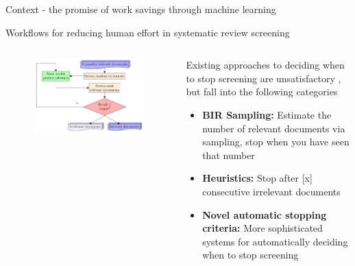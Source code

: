 \documentclass[9pt, aspectratio=169]{beamer}
\begin{document}
\begin{frame}{Context - the promise of work savings through machine learning}
\end{frame}

\begin{frame}{Workflows for reducing human effort in systematic review screening}

\begin{columns}
	\begin{column}{0.6\linewidth}
		\begin{figure}
			\includegraphics[width=\linewidth]{../images/flow_noeq_basic.pdf}
		\end{figure}
	\end{column}
	\begin{column}{0.4\linewidth}
		Existing approaches to deciding when to stop screening are unsatisfactory \cite{bannach-brown2019, Marshall2019}, but fall into the following categories
		
		\medskip
		
		\begin{itemize}
			\item \textbf{BIR Sampling:} Estimate the number of relevant documents via sampling, stop when you have seen that number \cite{Shemilt2014}
			\item \textbf{Heuristics:} Stop after [x] consecutive irrelevant documents \cite{Jonnalagadda2013, Przybya2018}
			\item \textbf{Novel automatic stopping criteria:} More sophisticated systems for automatically deciding when to stop screening \cite{Yu2019, DiNunzio2018, Howard2020}
		\end{itemize}
		
	\end{column}
\end{columns}

\end{frame}
\end{document}
